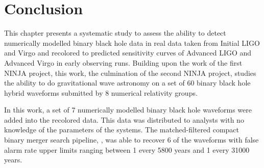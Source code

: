 
\section{Conclusion}
\label{sec:conclusions}

This chapter presents a systematic study to assess the ability to 
detect numerically modelled binary black hole data in real data taken from 
Initial LIGO and Virgo and recolored to predicted sensitivity curves of 
Advanced LIGO and Advanced Virgo in early observing runs. Building upon the 
work of the first NINJA project, this work, the culmination of the second NINJA 
project, studies the ability to do gravitational wave astronomy on a set of 60 
binary black hole hybrid waveforms submitted by 8 numerical relativity groups. 

In this work, a set of 7 numerically modelled binary black hole waveforms were 
added into the recolored data. This data was distributed to analysts with no 
knowledge of the parameters of the systems. 
The matched-filtered compact 
binary merger search pipeline, \ihope{},
was able 
to recover 6 of the waveforms with false alarm rate upper limits ranging 
between 
1 every 5800 years and 1 every 31000 years. 

